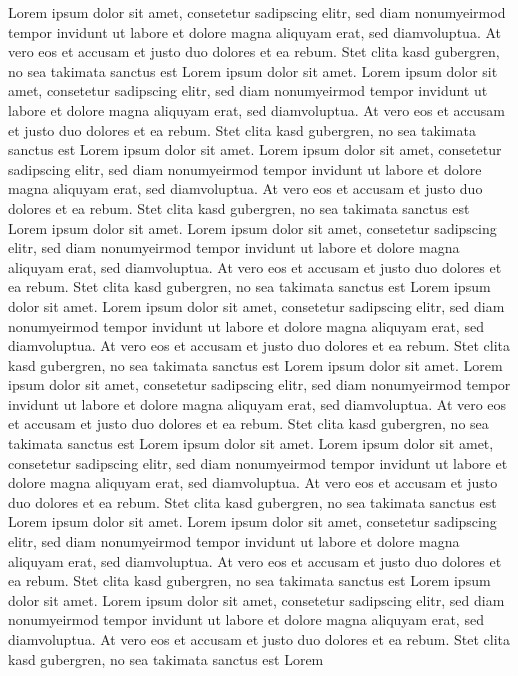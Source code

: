 \documentclass[
	a4paper,%
	oneside,%
	12pt,%
	halfparskip,%
	headinclude,%
	headsepline,%
	plainheadsepline,
	footsepline, %
	plainfootsepline,
	bibtotoc,%
	liststotoc,%
	toc=bibliography,
	]{scrbook}
\begin{document}
Lorem ipsum dolor sit amet, consetetur sadipscing elitr, sed diam
nonumyeirmod tempor invidunt ut labore et dolore magna aliquyam erat,
sed diamvoluptua. At vero eos et accusam et justo duo dolores et ea
rebum. Stet clita kasd gubergren, no sea takimata sanctus est Lorem
ipsum dolor sit amet. Lorem ipsum dolor sit amet, consetetur sadipscing
elitr, sed diam nonumyeirmod tempor invidunt ut labore et dolore magna
aliquyam erat, sed diamvoluptua. At vero eos et accusam et justo duo
dolores et ea rebum. Stet clita kasd gubergren, no sea takimata sanctus
est Lorem ipsum dolor sit amet. Lorem ipsum dolor sit amet, consetetur
sadipscing elitr, sed diam nonumyeirmod tempor invidunt ut labore et
dolore magna aliquyam erat, sed diamvoluptua. At vero eos et accusam et
justo duo dolores et ea rebum. Stet clita kasd gubergren, no sea
takimata sanctus est Lorem ipsum dolor sit amet. Lorem ipsum dolor sit
amet, consetetur sadipscing elitr, sed diam nonumyeirmod tempor
invidunt ut labore et dolore magna aliquyam erat, sed diamvoluptua. At
vero eos et accusam et justo duo dolores et ea rebum. Stet clita kasd
gubergren, no sea takimata sanctus est Lorem ipsum dolor sit amet.
Lorem ipsum dolor sit amet, consetetur sadipscing elitr, sed diam
nonumyeirmod tempor invidunt ut labore et dolore magna aliquyam erat,
sed diamvoluptua. At vero eos et accusam et justo duo dolores et ea
rebum. Stet clita kasd gubergren, no sea takimata sanctus est Lorem
ipsum dolor sit amet. Lorem ipsum dolor sit amet, consetetur sadipscing
elitr, sed diam nonumyeirmod tempor invidunt ut labore et dolore magna
aliquyam erat, sed diamvoluptua. At vero eos et accusam et justo duo
dolores et ea rebum. Stet clita kasd gubergren, no sea takimata sanctus
est Lorem ipsum dolor sit amet. Lorem ipsum dolor sit amet, consetetur
sadipscing elitr, sed diam nonumyeirmod tempor invidunt ut labore et
dolore magna aliquyam erat, sed diamvoluptua. At vero eos et accusam et
justo duo dolores et ea rebum. Stet clita kasd gubergren, no sea
takimata sanctus est Lorem ipsum dolor sit amet. Lorem ipsum dolor sit
amet, consetetur sadipscing elitr, sed diam nonumyeirmod tempor
invidunt ut labore et dolore magna aliquyam erat, sed diamvoluptua. At
vero eos et accusam et justo duo dolores et ea rebum. Stet clita kasd
gubergren, no sea takimata sanctus est Lorem ipsum dolor sit amet.
Lorem ipsum dolor sit amet, consetetur sadipscing elitr, sed diam
nonumyeirmod tempor invidunt ut labore et dolore magna aliquyam erat,
sed diamvoluptua. At vero eos et accusam et justo duo dolores et ea
rebum. Stet clita kasd gubergren, no sea takimata sanctus est Lorem
\end{document}
